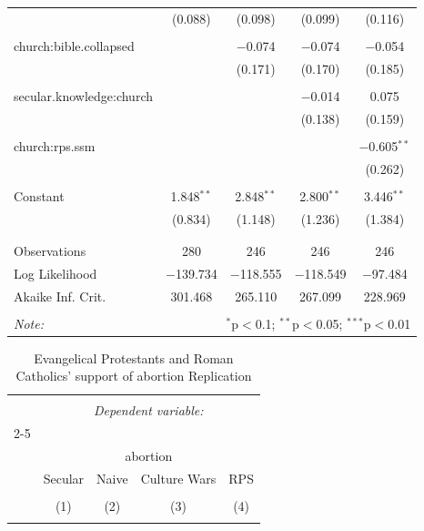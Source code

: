 \documentclass[12pt,letterpaper]{article}
\begin{document}
\begin{description}
\begin{table}[H]
\begin{tabular}{@{\extracolsep{5pt}}lcccc}
		& (0.088) & (0.098) & (0.099) & (0.116) \\ 
		& & & & \\ 
		church:bible.collapsed &  & $-$0.074 & $-$0.074 & $-$0.054 \\ 
		&  & (0.171) & (0.170) & (0.185) \\ 
		& & & & \\ 
		secular.knowledge:church &  &  & $-$0.014 & 0.075 \\ 
		&  &  & (0.138) & (0.159) \\ 
		& & & & \\ 
		church:rps.ssm &  &  &  & $-$0.605$^{**}$ \\ 
		&  &  &  & (0.262) \\ 
		& & & & \\ 
		Constant & 1.848$^{**}$ & 2.848$^{**}$ & 2.800$^{**}$ & 3.446$^{**}$ \\ 
		& (0.834) & (1.148) & (1.236) & (1.384) \\ 
		& & & & \\ 
		\hline \\[-1.8ex] 
		Observations & 280 & 246 & 246 & 246 \\ 
		Log Likelihood & $-$139.734 & $-$118.555 & $-$118.549 & $-$97.484 \\ 
		Akaike Inf. Crit. & 301.468 & 265.110 & 267.099 & 228.969 \\ 
		\hline 
		\hline \\[-1.8ex] 
		\textit{Note:}  & \multicolumn{4}{r}{$^{*}$p$<$0.1; $^{**}$p$<$0.05; $^{***}$p$<$0.01} \\ 
	\end{tabular} 
\end{table} 
\begin{table}[H] \centering 
	\caption{Evangelical Protestants and Roman Catholics' support of abortion Replication} 
	\label{} 
	\scriptsize 
	\begin{tabular}{@{\extracolsep{5pt}}lcccc} 
		\\[-1.8ex]\hline 
		\hline \\[-1.8ex] 
		& \multicolumn{4}{c}{\textit{Dependent variable:}} \\ 
		\cline{2-5} 
		\\[-1.8ex] & \multicolumn{4}{c}{abortion} \\ 
		& Secular & Naive & Culture Wars & RPS \\ 
		\\[-1.8ex] & (1) & (2) & (3) & (4)\\ 
		\hline \\[-1.8ex] 

\end{tabular}
\end{table}
\end{description}
\end{document}
